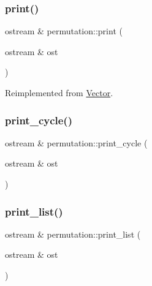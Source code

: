 \mbox{\label{classpermutation_a3a4c219748ab79362fd440bea839c094}} 
\subsubsection{\texorpdfstring{print()}{print()}}
{\footnotesize\ttfamily ostream \& permutation\+::print (\begin{DoxyParamCaption}\item[{ostream \&}]{ost }\end{DoxyParamCaption})\hspace{0.3cm}{\ttfamily [virtual]}}



Reimplemented from \mbox{\hyperlink{class_vector_a71d7e24bcfdfc69d4a2137360acb066c}{Vector}}.

\mbox{\label{classpermutation_abf779232815eb4c16286cf642d214b50}} 
\subsubsection{\texorpdfstring{print\+\_\+cycle()}{print\_cycle()}}
{\footnotesize\ttfamily ostream \& permutation\+::print\+\_\+cycle (\begin{DoxyParamCaption}\item[{ostream \&}]{ost }\end{DoxyParamCaption})}

\mbox{\label{classpermutation_a1732236cf59bbcaab008473f4917db3e}} 
\subsubsection{\texorpdfstring{print\+\_\+list()}{print\_list()}}
{\footnotesize\ttfamily ostream \& permutation\+::print\+\_\+list (\begin{DoxyParamCaption}\item[{ostream \&}]{ost }\end{DoxyParamCaption})}

\mbox{\label{classpermutation_ad3c756e8f0db2c95dfa7e6834c4bbaa3}} 
